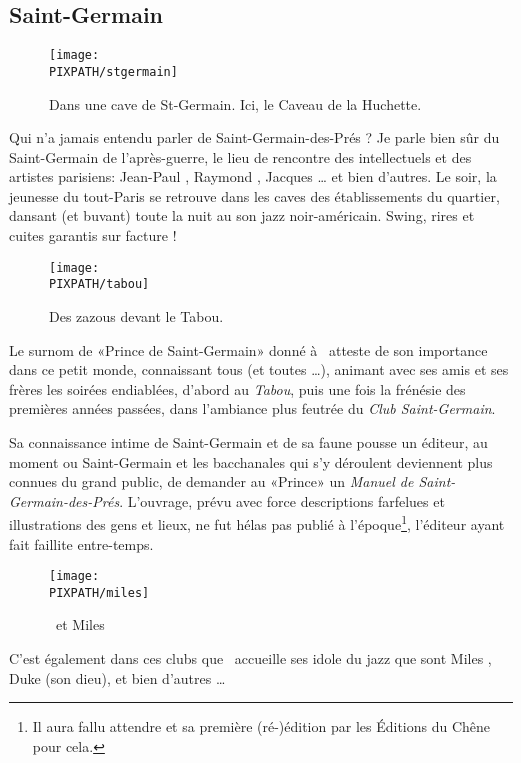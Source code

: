 \subsection{Saint-Germain}
\begin{wrapfigure}{r}{.5\textwidth}
\centering
\texttt{[image: \\PIXPATH/stgermain]}
\caption{Dans une cave de St-Germain. Ici, le Caveau de la Huchette.}
\end{wrapfigure}
Qui n'a jamais entendu parler de Saint-Germain-des-Prés ? Je parle bien sûr
du Saint-Germain de l'après-guerre, le lieu de rencontre des intellectuels et
des artistes parisiens: Jean-Paul , Raymond , Jacques \ldots %
et bien d'autres. Le soir, la jeunesse du tout-Paris se retrouve dans les caves
des établissements du quartier, dansant (et buvant) toute la nuit au son jazz
noir-américain. Swing, rires et cuites garantis sur facture !


\begin{wrapfigure}{l}{.5\textwidth}
\centering
\texttt{[image: \\PIXPATH/tabou]}
\caption{Des zazous devant le Tabou.}
\end{wrapfigure}
Le surnom de «Prince de Saint-Germain» donné à \BV\ atteste de son importance
dans ce petit monde, connaissant tous (et toutes \ldots), animant avec ses amis et
ses frères les soirées endiablées, d'abord au \emph{Tabou}, puis une fois la
frénésie des premières années passées, dans l'ambiance plus feutrée du \emph{Club
Saint-Germain}.

Sa connaissance intime de Saint-Germain et de sa faune pousse un éditeur, au moment
ou Saint-Germain et les bacchanales qui s'y déroulent deviennent plus connues du
grand public, de demander au «Prince» un \emph{Manuel de Saint-Germain-des-Prés}.
L'ouvrage, prévu avec force descriptions farfelues et illustrations des gens et
lieux, ne fut hélas pas publié à l'époque\footnote{Il aura fallu attendre  et sa première (ré-)édition par les Éditions du Chêne pour cela. }, l'éditeur ayant fait faillite entre-temps.

\begin{figure}
\centering
\texttt{[image: \\PIXPATH/miles]}
\caption{\BV\ et Miles }
\end{figure}
C'est également dans ces clubs que \BV\ accueille ses idole du jazz que sont
Miles , Duke  (son dieu), et bien d'autres \ldots

